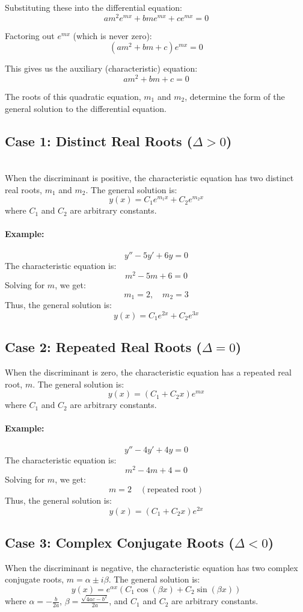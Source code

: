 \documentclass[a4paper,12pt]{article}
\begin{document}
Substituting these into the differential equation:
\[
a m^2 e^{mx} + b m e^{mx} + c e^{mx} = 0
\]

Factoring out \( e^{mx} \) (which is never zero):
\[
(a m^2 + b m + c) e^{mx} = 0
\]

This gives us the auxiliary (characteristic) equation:
\[
a m^2 + b m + c = 0
\]

The roots of this quadratic equation, \( m_1 \) and \( m_2 \), determine the form of the general solution to the differential equation.\\

\subsection*{Case 1: Distinct Real Roots (\(\Delta > 0\))}\\
When the discriminant is positive, the characteristic equation has two distinct real roots, \(m_1\) and \(m_2\). The general solution is:
\[
y(x) = C_1 e^{m_1 x} + C_2 e^{m_2 x}
\]
where \(C_1\) and \(C_2\) are arbitrary constants.

\paragraph{Example:}
\[
y'' - 5y' + 6y = 0
\]
The characteristic equation is:
\[
m^2 - 5m + 6 = 0
\]
Solving for \(m\), we get:
\[
m_1 = 2, \quad m_2 = 3
\]
Thus, the general solution is:
\[
y(x) = C_1 e^{2x} + C_2 e^{3x}
\]

\subsection*{Case 2: Repeated Real Roots (\(\Delta = 0\))}
When the discriminant is zero, the characteristic equation has a repeated real root, \(m\). The general solution is:
\[
y(x) = (C_1 + C_2 x) e^{m x}
\]
where \(C_1\) and \(C_2\) are arbitrary constants.

\paragraph{Example:}
\[
y'' - 4y' + 4y = 0
\]
The characteristic equation is:
\[
m^2 - 4m + 4 = 0
\]
Solving for \(m\), we get:
\[
m = 2 \quad (\text{repeated root})
\]
Thus, the general solution is:
\[
y(x) = (C_1 + C_2 x) e^{2x}
\]

\subsection*{Case 3: Complex Conjugate Roots (\(\Delta < 0\))}
When the discriminant is negative, the characteristic equation has two complex conjugate roots, \(m = \alpha \pm i\beta\). The general solution is:
\[
y(x) = e^{\alpha x} (C_1 \cos(\beta x) + C_2 \sin(\beta x))
\]
where \(\alpha = -\frac{b}{2a}\), \(\beta = \frac{\sqrt{4ac - b^2}}{2a}\), and \(C_1\) and \(C_2\) are arbitrary constants.
\end{document}
